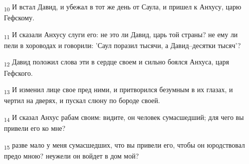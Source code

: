 \begin{tcolorbox}
\textsubscript{10} И встал Давид, и убежал в тот же день от Саула, и пришел к Анхусу, царю Гефскому.
\end{tcolorbox}
\begin{tcolorbox}
\textsubscript{11} И сказали Анхусу слуги его: не это ли Давид, царь той страны? не ему ли пели в хороводах и говорили: 'Саул поразил тысячи, а Давид--десятки тысяч'?
\end{tcolorbox}
\begin{tcolorbox}
\textsubscript{12} Давид положил слова эти в сердце своем и сильно боялся Анхуса, царя Гефского.
\end{tcolorbox}
\begin{tcolorbox}
\textsubscript{13} И изменил лице свое пред ними, и притворился безумным в их глазах, и чертил на дверях, и пускал слюну по бороде своей.
\end{tcolorbox}
\begin{tcolorbox}
\textsubscript{14} И сказал Анхус рабам своим: видите, он человек сумасшедший; для чего вы привели его ко мне?
\end{tcolorbox}
\begin{tcolorbox}
\textsubscript{15} разве мало у меня сумасшедших, что вы привели его, чтобы он юродствовал предо мною? неужели он войдет в дом мой?
\end{tcolorbox}
